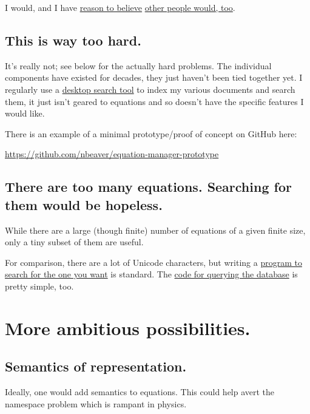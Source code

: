 \documentclass[12pt,letterpaper]{article}
\begin{document}
I would, and I have \href{http://www.researchgate.net/post/I_am_looking_for_an_equation_database_or_digital_list_of_equations}{reason to believe} \href{http://productforums.google.com/forum/#!topic/websearch/lVJiyCSl-xk}{other people would, too}.

\subsection{This is way too hard.}

It's really not; see below for the actually hard problems. The individual components have existed for decades, they just haven't been tied together yet. I regularly use a \href{https://en.wikipedia.org/wiki/Recoll}{desktop search tool} to index my various documents and search them, it just isn't geared to equations and so doesn't have the specific features I would like.

There is an example of a minimal prototype/proof of concept on GitHub here:

\href{https://github.com/nbeaver/equation-manager-prototype}{https://github.com/nbeaver/equation-manager-prototype}

\subsection{There are too many equations. Searching for them would be hopeless.}

While there are a large (though finite) number of equations of a given finite size, only a tiny subset of them are useful.

For comparison, there are a lot of Unicode characters, but writing a \href{https://mail.python.org/pipermail/python-announce-list/2003-April/002183.html}{program to search for the one you want} is standard. The \href{http://sources.debian.net/src/unicode/0.9.7/unicode}{code for querying the database} is pretty simple, too.

\section{More ambitious possibilities.}

\subsection{Semantics of representation.}

Ideally, one would add semantics to equations. This could help avert the namespace problem which is rampant in physics.
\end{document}
